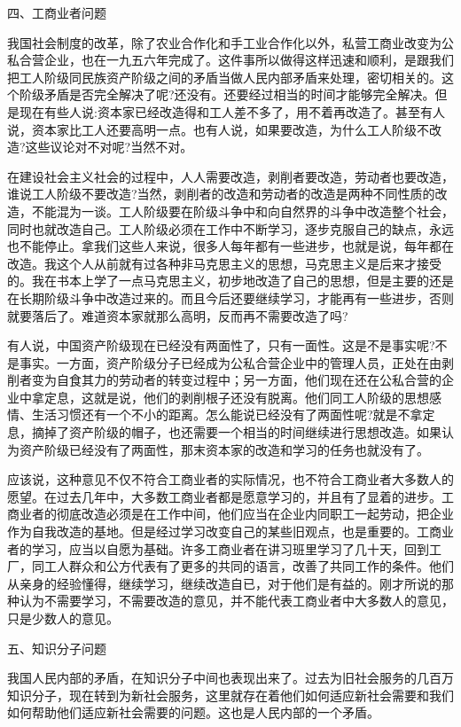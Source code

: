 \documentclass[UTF8, 12pt, a4paper]{ctexrep}
\begin{document}
四、工商业者问题

我国社会制度的改革，除了农业合作化和手工业合作化以外，私营工商业改变为公私合营企业，也在一九五六年完成了。这件事所以做得这样迅速和顺利，是跟我们把工人阶级同民族资产阶级之间的矛盾当做人民内部矛盾来处理，密切相关的。这个阶级矛盾是否完全解决了呢?还没有。还要经过相当的时间才能够完全解决。但是现在有些人说:资本家已经改造得和工人差不多了，用不着再改造了。甚至有人说，资本家比工人还要高明一点。也有人说，如果要改造，为什么工人阶级不改造?这些议论对不对呢?当然不对。

在建设社会主义社会的过程中，人人需要改造，剥削者要改造，劳动者也要改造，谁说工人阶级不要改造?当然，剥削者的改造和劳动者的改造是两种不同性质的改造，不能混为一谈。工人阶级要在阶级斗争中和向自然界的斗争中改造整个社会，同时也就改造自己。工人阶级必须在工作中不断学习，逐步克服自己的缺点，永远也不能停止。拿我们这些人来说，很多人每年都有一些进步，也就是说，每年都在改造。我这个人从前就有过各种非马克思主义的思想，马克思主义是后来才接受的。我在书本上学了一点马克思主义，初步地改造了自己的思想，但是主要的还是在长期阶级斗争中改造过来的。而且今后还要继续学习，才能再有一些进步，否则就要落后了。难道资本家就那么高明，反而再不需要改造了吗?

有人说，中国资产阶级现在已经没有两面性了，只有一面性。这是不是事实呢?不是事实。一方面，资产阶级分子已经成为公私合营企业中的管理人员，正处在由剥削者变为自食其力的劳动者的转变过程中；另一方面，他们现在还在公私合营的企业中拿定息，这就是说，他们的剥削根子还没有脱离。他们同工人阶级的思想感情、生活习惯还有一个不小的距离。怎么能说已经没有了两面性呢?就是不拿定息，摘掉了资产阶级的帽子，也还需要一个相当的时间继续进行思想改造。如果认为资产阶级已经没有了两面性，那末资本家的改造和学习的任务也就没有了。

应该说，这种意见不仅不符合工商业者的实际情况，也不符合工商业者大多数人的愿望。在过去几年中，大多数工商业者都是愿意学习的，并且有了显着的进步。工商业者的彻底改造必须是在工作中间，他们应当在企业内同职工一起劳动，把企业作为自我改造的基地。但是经过学习改变自己的某些旧观点，也是重要的。工商业者的学习，应当以自愿为基础。许多工商业者在讲习班里学习了几十天，回到工厂，同工人群众和公方代表有了更多的共同的语言，改善了共同工作的条件。他们从亲身的经验懂得，继续学习，继续改造自已，对于他们是有益的。刚才所说的那种认为不需要学习，不需要改造的意见，并不能代表工商业者中大多数人的意见，只是少数人的意见。

五、知识分子问题

我国人民内部的矛盾，在知识分子中间也表现出来了。过去为旧社会服务的几百万知识分子，现在转到为新社会服务，这里就存在着他们如何适应新社会需要和我们如何帮助他们适应新社会需要的问题。这也是人民内部的一个矛盾。
\end{document}
